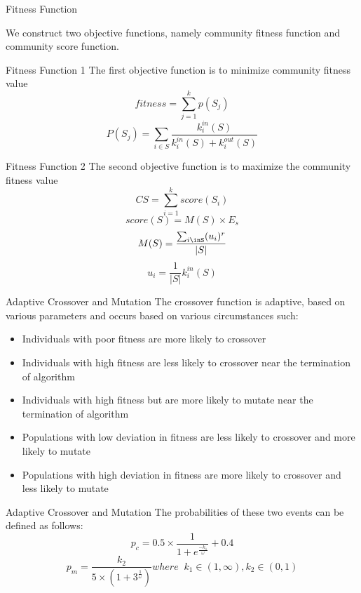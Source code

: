 \documentclass[aspectratio=169,xcolor=dvipsnames]{beamer}
\begin{document}
\begin{frame}{Fitness Function}

    We construct two objective functions, namely community fitness function and community score function.

\end{frame}

\begin{frame}{Fitness Function 1}
    The first objective function is to minimize community fitness value
    $$fitness = \sum_{j=1}^{k}p(S_j)$$
    $$P(S_j) = \sum_{i\in S} \frac{k^{in}_i(S)}{k^{in}_i(S) + k_i^{out}(S)}$$
  \end{frame}
  
\begin{frame}{Fitness Function 2}
  The second objective function is to maximize the community fitness value
    $$CS = \sum_{i=1}^k score(S_i)$$
    $$score(S) = M(S)\times E_s$$
    $$M(S) = \frac{\sum_{i\inS}(u_i)^r}{|S|}$$
    $$u_i = \frac{1}{|S|}k^{in}_i(S)$$
     
 \end{frame}
\begin{frame}{Adaptive Crossover and Mutation}
The crossover function is adaptive, based on various parameters and occurs based on various circumstances such: 
\begin{itemize}
    \item Individuals with poor fitness are more likely to crossover
    \item Individuals with high fitness are less likely to crossover near the termination of algorithm
    \item Individuals with high fitness but are more likely to mutate near the termination of algorithm
    \item Populations with low deviation in fitness are less likely to crossover and more likely to mutate
    \item Populations with high deviation in fitness are more likely to crossover and less likely to mutate 
\end{itemize}
\newpage
\end{frame}
\begin{frame}{Adaptive Crossover and Mutation}
The probabilities of these two events can be defined as follows:
$$p_c = 0.5 \times \frac{1}{1+e^{\frac{-k_1}{\omega}}} + 0.4$$
$$p_m = \frac{k_2}{5\times(1+3^{\frac{1}{\omega}})} where \;\; k_1 \in (1, \infty), k_2 \in (0,1)$$


    
\end{frame}
\end{document}
